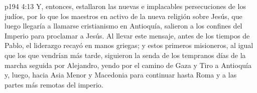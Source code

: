 \vs p194 4:13 Y, entonces, estallaron las nuevas e implacables persecuciones de los judíos, por lo que los maestros en activo de la nueva religión sobre Jesús, que luego llegaría a llamarse cristianismo en Antioquía, salieron a los confines del Imperio para proclamar a Jesús. Al llevar este mensaje, antes de los tiempos de Pablo, el liderazgo recayó en manos griegas; y estos primeros misioneros, al igual que los que vendrían más tarde, siguieron la senda de los tempranos días de la marcha seguida por Alejandro, yendo por el camino de Gaza y Tiro a Antioquía y, luego, hacia Asia Menor y Macedonia para continuar hasta Roma y a las partes más remotas del imperio.
